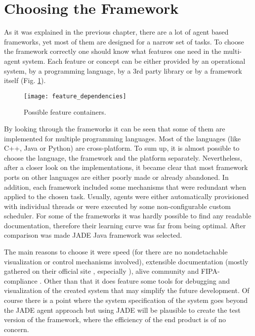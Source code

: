 \section{Choosing the Framework}
As it was explained in the previous chapter, there are a lot of agent based frameworks, yet most of them are designed for a narrow set of tasks. To choose the framework correctly one should know what features one need in the multi-agent system. Each feature or concept can be either provided by an operational system, by a programming language, by a 3rd party library or by a framework itself (Fig. \ref{Feature}).
 \begin{figure}[h!]
    \begin{center}
      \texttt{[image: feature\_dependencies]}
      \caption{Possible feature containers.}
      \label{Feature}
     \end{center}
    \end{figure}

By looking through the frameworks it can be seen that some of them are implemented for multiple programming languages. Most of the languages (like C++, Java or Python) are cross-platform.
To sum up, it is almost possible to choose the language, the framework and the platform separately.
Nevertheless, after a closer look on the implementations, it became clear that most framework ports on other languages are either poorly made or already abandoned.
In addition, each framework included some mechanisms that were redundant when applied to the chosen task. Usually, agents were either automatically provisioned with individual threads or were executed by some non-configurable custom scheduler. For some of the frameworks it was hardly possible to find any readable documentation, therefore their learning curve was far from being optimal.  After comparison was made JADE Java framework was selected.

 The main reasons to choose it were speed \cite{JAVAap} (for there are no nondetachable visualization or control mechanisms involved), extensible documentation (mostly gathered on their official site \cite{jadeDoc}, especially \cite{jadeBook}), alive community and FIPA-compliance \cite{ap3}. Other than that it does feature some tools for debugging and visualization of the created system that may simplify the future development. Of course there is a point where the system specification of the system goes beyond the JADE agent approach but using JADE will be plausible to create the test version of the framework, where the efficiency of the end product is of no concern.

